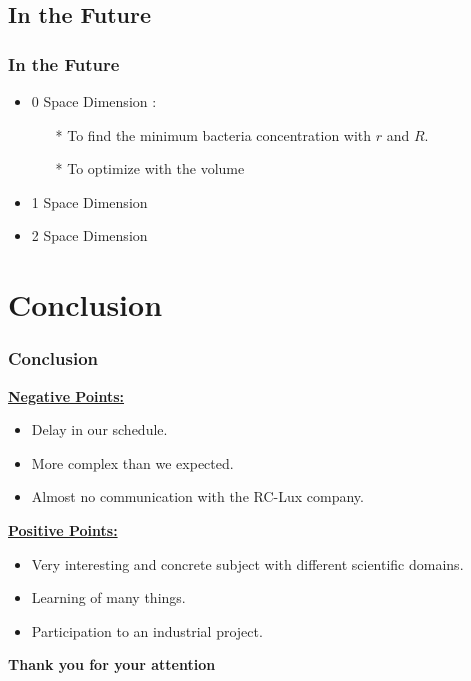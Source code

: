 \documentclass[xcolor=dvipsnames,10pt]{beamer}
\begin{document}
\subsection{In the Future}
\begin{frame}
\frametitle{In the Future}
\begin{itemize}
\item 0 Space Dimension :
	\begin{itemize} 
		\item[*] To find the minimum bacteria concentration with $r$ and $R$.
		\item[*] To optimize with the volume
	\end{itemize}
\vspace{1cm}
\item 1 Space Dimension
\vspace{1cm}
\item 2 Space Dimension

\end{itemize}
\end{frame}


\section{Conclusion}

\begin{frame}
	\frametitle{Conclusion}
\underline{\textbf{\color{blue}Negative Points:}}\\
 \begin{itemize}
  \item Delay in our schedule.
  \item More complex than we expected.
  \item Almost no communication with the RC-Lux company.
  \end{itemize}

\underline{\textbf{\color{blue}Positive Points:}}\\ 
 \begin{itemize}
  \item Very interesting and concrete subject with different scientific domains.
  \item Learning of many things.
  \item Participation to an industrial project.
 \end{itemize}
\end{frame}

\begin{frame}
\vspace{8mm}
\hspace{4mm}
\huge{\textbf{\color{blue}Thank you for your attention}}
\end{frame}
\end{document}
